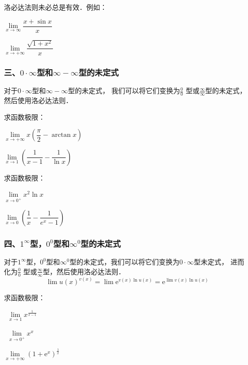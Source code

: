 \documentclass[14pt,notheorems,leqno,xcolor={rgb}]{beamer} %
\begin{document}
\begin{frame}
\begin{remark}洛必达法则未必总是有效．例如：
\begin{enumhalf}
  \item $\lim\limits_{x\to\infty}\dfrac{x+\sin x}{x}$ ~\pause
  \item $\lim\limits_{x\to+\infty}\dfrac{\sqrt{1+x^2}}{x}$ ~
\end{enumhalf}
\end{remark}
\end{frame}

\begin{frame}
\frametitle{三、$0\cdot\infty$型和$\infty-\infty$型的未定式}
对于$0\cdot\infty$型和$\infty-\infty$型的未定式，
我们可以将它们变换为$\frac00$ 型或$\frac{\infty}{\infty}$型的未定式，
然后使用洛必达法则．\pause
\begin{example}
求函数极限：
\begin{enumlite}
  \item $\lim\limits_{x\to+\infty}x\left(\dfrac\pi2-\arctan x\right)$\pause
  \item $\lim\limits_{x\to1}\left(\dfrac{1}{x-1}-\dfrac1{\ln x}\right)$
\end{enumlite}
\end{example}
\end{frame}

\begin{frame}
\begin{exercise}
求函数极限：
\begin{enumhalf}
  \item $\lim\limits_{x\to0^+}x^2\ln x$ ~
  \item $\lim\limits_{x\to0}\left(\dfrac{1}{x}-\dfrac1{e^x-1}\right)$ ~
\end{enumhalf}
\end{exercise}
\end{frame}

\begin{frame}
\frametitle{四、$1^\infty$型，$0^0$型和$\infty^0$型的未定式}
对于$1^\infty$型，$0^0$型和$\infty^0$型的未定式，我们可以将它们变换为$0\cdot\infty$型未定式，
进而化为$\frac00$ 型或$\frac{\infty}{\infty}$型，然后使用洛必达法则．\pause
\[\lim u(x)^{v(x)}=\lim \mathrm{e}^{v(x)\ln u(x)} = \mathrm{e}^{\lim v(x)\ln u(x)}\]
\end{frame}

\begin{frame}
\begin{example}
求函数极限：
\begin{enumlite}
  \item \ $\lim\limits_{x\to1}x^{\frac{1}{x-1}}$\pause
  \item \ $\lim\limits_{x\to0^+}x^x$\pause
  \item $\lim\limits_{x\to+\infty}\left(1+\mathrm{e}^x\right)^{\frac1x}$
\end{enumlite}
\end{example}
\end{frame}
\end{document}
